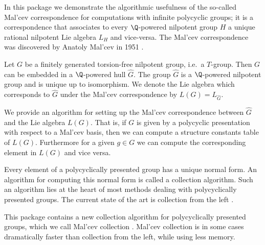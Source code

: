 

In this package we demonstrate the algorithmic usefulness of the
so-called Mal'cev correspondence for computations with infinite polycyclic
groups; it is a correspondence
that associates to every $\Q$-powered nilpotent group $H$ a
unique rational nilpotent Lie algebra $L_H$ and vice-versa.
The Mal'cev correspondence was discovered 
by Anatoly Mal'cev in 1951 \cite{Mal51}.


Let $G$ be a finitely generated torsion-free nilpotent group, 
i.e.\ a $T$-group.
Then $G$ can be embedded in a $\Q$-powered hull $\hat{G}$.
The group $\hat{G}$ is
a $\Q$-powered nilpotent group and  
is unique up to isomorphism. 
We denote the Lie algebra
which corresponds to $\hat{G}$ under the Mal'cev correspondence by
$L(G)= L_{\hat{G}}$.

We provide an algorithm for setting up the 
Mal'cev correspondence
between $\hat{G}$ and the Lie algebra $L(G)$. 
That is, if $G$
is given by a polycyclic presentation with respect to a Mal'cev basis,
then we can compute a structure constants table of $L(G)$.
Furthermore for a given $g\in G$ we can compute the corresponding 
element in $L(G)$ and vice versa. 


Every element of a
polycyclically presented
group has a unique normal form. An algorithm for computing this normal
form is called a collection algorithm. Such an algorithm
lies at the heart of most methods
dealing with polycyclically presented groups. The current state of
the art is collection from the left 
\cite{Geb02,LGS90,VLe90}.

This package contains
a new collection algorithm for polycyclically presented groups,
which we call Mal'cev collection \cite{ALi07}.
Mal'cev collection is
in some cases dramatically faster than
collection from the left, while using less memory.







